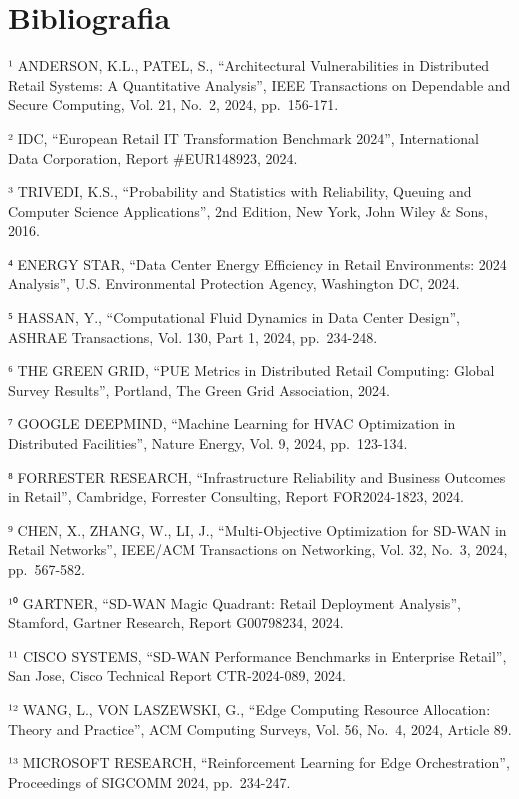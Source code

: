 \documentclass[12pt,a4paper,oneside]{book}
\numberwithin{figure}{chapter} %
\numberwithin{table}{chapter}  %
\begin{document}
\section{Bibliografia}\label{bibliografia}

¹ ANDERSON, K.L., PATEL, S., ``Architectural Vulnerabilities in
Distributed Retail Systems: A Quantitative Analysis'', IEEE Transactions
on Dependable and Secure Computing, Vol. 21, No.~2, 2024, pp.~156-171.

² IDC, ``European Retail IT Transformation Benchmark 2024'',
International Data Corporation, Report \#EUR148923, 2024.

³ TRIVEDI, K.S., ``Probability and Statistics with Reliability, Queuing
and Computer Science Applications'', 2nd Edition, New York, John Wiley
\& Sons, 2016.

⁴ ENERGY STAR, ``Data Center Energy Efficiency in Retail Environments:
2024 Analysis'', U.S. Environmental Protection Agency, Washington DC,
2024.

⁵ HASSAN, Y., ``Computational Fluid Dynamics in Data Center Design'',
ASHRAE Transactions, Vol. 130, Part 1, 2024, pp.~234-248.

⁶ THE GREEN GRID, ``PUE Metrics in Distributed Retail Computing: Global
Survey Results'', Portland, The Green Grid Association, 2024.

⁷ GOOGLE DEEPMIND, ``Machine Learning for HVAC Optimization in
Distributed Facilities'', Nature Energy, Vol. 9, 2024, pp.~123-134.

⁸ FORRESTER RESEARCH, ``Infrastructure Reliability and Business Outcomes
in Retail'', Cambridge, Forrester Consulting, Report FOR2024-1823, 2024.

⁹ CHEN, X., ZHANG, W., LI, J., ``Multi-Objective Optimization for SD-WAN
in Retail Networks'', IEEE/ACM Transactions on Networking, Vol. 32,
No.~3, 2024, pp.~567-582.

¹⁰ GARTNER, ``SD-WAN Magic Quadrant: Retail Deployment Analysis'',
Stamford, Gartner Research, Report G00798234, 2024.

¹¹ CISCO SYSTEMS, ``SD-WAN Performance Benchmarks in Enterprise
Retail'', San Jose, Cisco Technical Report CTR-2024-089, 2024.

¹² WANG, L., VON LASZEWSKI, G., ``Edge Computing Resource Allocation:
Theory and Practice'', ACM Computing Surveys, Vol. 56, No.~4, 2024,
Article 89.

¹³ MICROSOFT RESEARCH, ``Reinforcement Learning for Edge
Orchestration'', Proceedings of SIGCOMM 2024, pp.~234-247.
\end{document}
